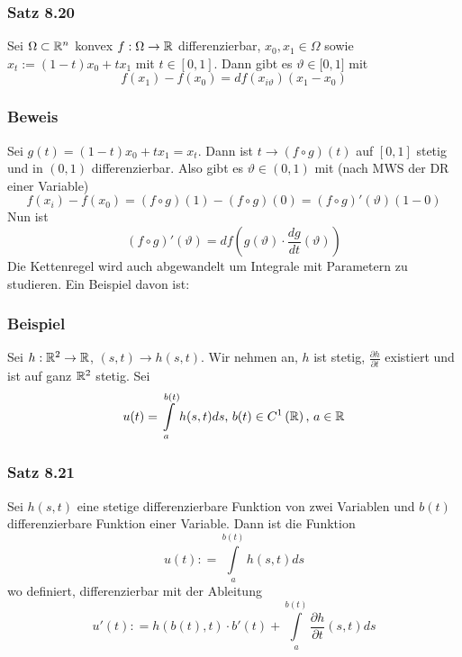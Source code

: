 \subsubsection*{Satz 8.20}
Sei $\Omega\subset\mathbb{R}^n$ konvex $f:\Omega\to\mathbb{R}$ differenzierbar, $x_0,x_1\in\Omega$ sowie ${x_t:=\left( 1-t\right) x_0+tx_1}$ mit ${t \in [0,1]}$. Dann gibt es $\vartheta\in\lbrack 0,1\rbrack$ mit \[f\left( {{x_1}} \right) - f\left( {{x_0}} \right) = df\left( {{x_{i\vartheta }}} \right)\left( {{x_1} - {x_0}} \right)\]

\subsubsection*{Beweis}
Sei $g\left( t\right) = \left( 1-t\right) x_0+tx_1=x_t$. Dann ist $t\to \left( f\circ g\right)(t)$ auf $\left[ 0,1\right]$ stetig und in $\left( 0,1\right)$ differenzierbar. Also gibt es $\vartheta\in\left( 0,1\right)$ mit (nach MWS der DR einer Variable) \[f\left( {{x_i}} \right) - f\left( {{x_0}} \right) = \left( {f \circ g} \right)(1) - \left( {f \circ g} \right)(0) = \left( {f \circ g} \right)'\left( \vartheta  \right)\left( {1 - 0} \right)\] Nun ist \[\left( {f \circ g} \right)'\left( \vartheta  \right) = df\left( {g\left( \vartheta  \right) \cdot \frac{{dg}}{{dt}}\left( \vartheta  \right)} \right)\] 
Die Kettenregel wird auch abgewandelt um Integrale mit Parametern zu studieren. Ein Beispiel davon ist:

\subsubsection*{Beispiel}
Sei $h:\mathbb{R}^2\to\mathbb{R}$, $\left( s,t\right)\to h\left(s,t \right)$. Wir nehmen an, $h$ ist stetig, $\frac{\partial h}{\partial t}$ existiert und ist auf ganz $\mathbb{R}^2$ stetig. Sei
\[u(t) = \int\limits_a^{b(t)} {h(s,t)ds} {\text{, }}b(t) \in C^1\left( \mathbb{R} \right){\text{, }}a \in\mathbb{R}\]

\subsubsection*{Satz 8.21}
Sei $h(s,t)$ eine stetige differenzierbare Funktion von zwei Variablen und $b(t)$ differenzierbare Funktion einer Variable. Dann ist die Funktion \[u(t): = \int\limits_a^{b(t)} {h(s,t)ds} \] wo definiert, differenzierbar mit der Ableitung \[u'(t): = h\left( {b(t),t} \right) \cdot b'(t) + \int\limits_a^{b(t)} {\frac{{\partial h}}{{\partial t}}\left( {s,t} \right)ds} \]
